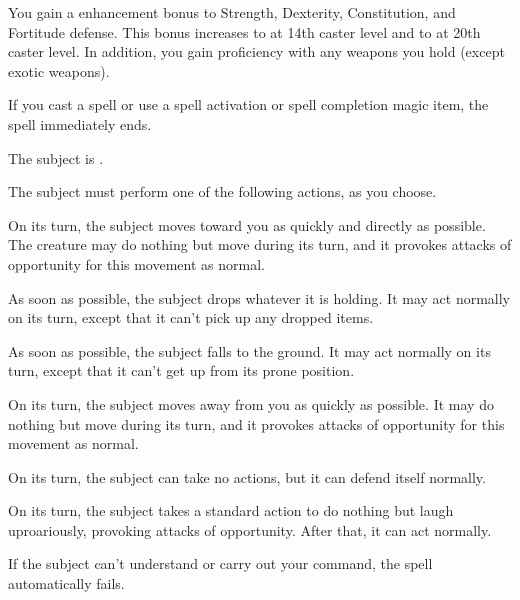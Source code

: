 \spellrng{\rngpers}
\begin{spelleffect}
  You gain a  enhancement bonus to Strength, Dexterity, Constitution, and Fortitude defense. This bonus increases to  at 14th caster level and to  at 20th caster level. In addition, you gain proficiency with any weapons you hold (except exotic weapons).
\end{spelleffect}
\begin{spellnotes}
  If you cast a spell or use a spell activation or spell completion magic item, the spell immediately ends.
\end{spellnotes}

\spellrng{\rngmed}
\begin{spellhealthy}
  The subject is \bewildered.
\end{spellhealthy}
\begin{spellblood}
  The subject must perform one of the following actions, as you choose.
  \par {} On its turn, the subject moves toward you as quickly and directly as possible. The creature may do nothing but move during its turn, and it provokes attacks of opportunity for this movement as normal.
  \par {} As soon as possible, the subject drops whatever it is holding. It may act normally on its turn, except that it can't pick up any dropped items.
  \par {} As soon as possible, the subject falls to the ground. It may act normally on its turn, except that it can't get up from its prone position.
  \par {} On its turn, the subject moves away from you as quickly as possible. It may do nothing but move during its turn, and it provokes attacks of opportunity for this movement as normal.
  \par {} On its turn, the subject can take no actions, but it can defend itself normally.
  \par {} On its turn, the subject takes a standard action to do nothing but laugh uproariously, provoking attacks of opportunity. After that, it can act normally.
\end{spellblood}
\begin{spellnotes}
  If the subject can't understand or carry out your command, the spell automatically fails.
\end{spellnotes}

